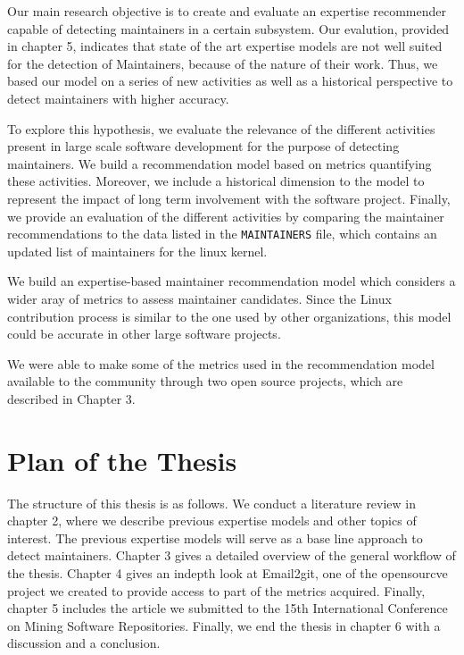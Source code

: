Our main research objective is to create and evaluate an expertise recommender capable of detecting maintainers in a certain subsystem. Our evalution, provided in chapter 5, indicates that state of the art expertise models are not well suited for the detection of Maintainers, because of the nature of their work. Thus, we based our model on a series of new activities as well as a historical perspective to detect maintainers with higher accuracy.




To explore this hypothesis, we evaluate the relevance of the different activities present in large scale software development for the purpose of detecting maintainers. We build a recommendation model based on metrics quantifying these activities. Moreover, we include a historical dimension to the model to represent the impact of long term involvement with the software project. Finally, we provide an evaluation of the different activities by comparing the maintainer recommendations to the data listed in the \texttt{MAINTAINERS} file, which contains an updated list of maintainers for the linux kernel.

We build an expertise-based maintainer recommendation model which considers a wider aray of metrics to assess maintainer candidates. Since the Linux contribution process is similar to the one used by other organizations, this model could be accurate in other large software projects. 

We were able to make some of the metrics used in the recommendation model available to the community through two open source projects, which are described in Chapter 3.



\section{Plan of the Thesis}


The structure of this thesis is as follows. We conduct a literature review in chapter 2, where we describe previous expertise models and other topics of interest. The previous expertise models will serve as a base line approach to detect maintainers. Chapter 3 gives a detailed overview of the general workflow of the thesis. Chapter 4 gives an indepth look at Email2git, one of the opensourcve project we created to provide access to part of the metrics acquired. Finally, chapter 5 includes the article we submitted to the 15th International Conference on Mining Software Repositories. Finally, we end the thesis in chapter 6 with a discussion and a conclusion. 



